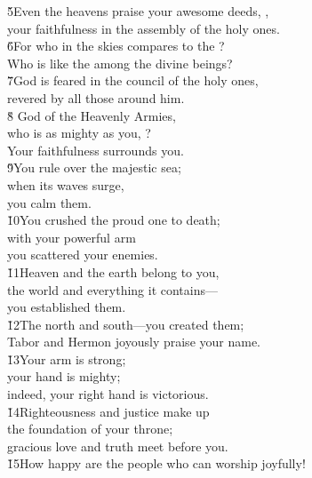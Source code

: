 \begin{poetry}
\poeml \v{5}Even the heavens praise your awesome deeds, , \\
\poemll    your faithfulness in the assembly of the holy ones. \\
\poeml \v{6}For who in the skies compares to the ? \\
\poemll    Who is like the  among the divine beings? \\
\poeml \v{7}God is feared in the council of the holy ones, \\
\poemll    revered by all those around him. \\
\poeml \v{8} God of the Heavenly Armies, \\
\poemll    who is as mighty as you, ? \\
\poemlll       Your faithfulness surrounds you. \\
\poeml \v{9}You rule over the majestic sea; \\
\poemll    when its waves surge, \\
\poemlll       you calm them. \\
\poeml \v{10}You crushed the proud one to death; \\
\poemll    with your powerful arm \\
\poemlll       you scattered your enemies. \\
\poeml \v{11}Heaven and the earth belong to you, \\
\poemll    the world and everything it contains--- \\
\poemlll       you established them. \\
\poeml \v{12}The north and south---you created them; \\
\poemll    Tabor and Hermon joyously praise your name. \\
\poeml \v{13}Your arm is strong; \\
\poemll    your hand is mighty; \\
\poemlll       indeed, your right hand is victorious. \\
\poeml \v{14}Righteousness and justice make up \\
\poemll    the foundation of your throne; \\
\poemlll       gracious love and truth meet before you. \\
\poeml \v{15}How happy are the people who can worship joyfully! \\

\end{poetry}
